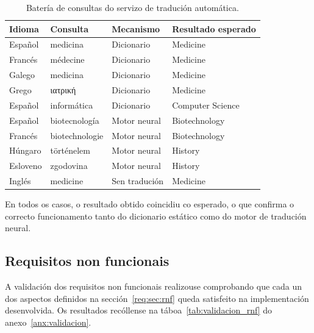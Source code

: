 \documentclass[%
    a4paper,               %
    twoside,               %
    10pt,                  %
]{article}                 %
\begin{document}
\begin{table}[t]
    \centering
    \begin{tabular}{p{3.05cm} p{3.6cm} p{3.6cm} p{4cm}}
        \hline
        \textbf{Idioma} & \textbf{Consulta}    & \textbf{Mecanismo} & \textbf{Resultado esperado} \\
        \hline
        Español         & medicina             & Dicionario         & Medicine                    \\
        Francés         & médecine             & Dicionario         & Medicine                    \\
        Galego          & medicina             & Dicionario         & Medicine                    \\
        Grego           & {\greekfont ιατρική} & Dicionario         & Medicine                    \\
        Español         & informática          & Dicionario         & Computer Science            \\
        Español         & biotecnología        & Motor neural       & Biotechnology               \\
        Francés         & biotechnologie       & Motor neural       & Biotechnology               \\
        Húngaro         & történelem           & Motor neural       & History                     \\
        Esloveno        & zgodovina            & Motor neural       & History                     \\
        Inglés          & medicine             & Sen tradución      & Medicine                    \\
        \hline
    \end{tabular}
    \caption{Batería de consultas do servizo de tradución automática.}
    \label{tab:probas_traduccion}
\end{table}

En todos os casos, o resultado obtido coincidiu co esperado, o que confirma o correcto funcionamento tanto do dicionario estático como do motor de tradución neural.

\subsection{Requisitos non funcionais}

A validación dos requisitos non funcionais realizouse comprobando que cada un dos aspectos definidos na sección~\ref{req:sec:rnf} queda satisfeito na implementación desenvolvida. Os resultados recóllense na táboa~\ref{tab:validacion_rnf} do anexo~\ref{anx:validacion}.
\end{document}
